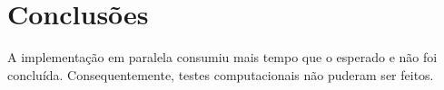 \section{Conclusões}
A implementação em paralela consumiu mais tempo que o esperado e não foi
concluída. Consequentemente, testes computacionais não puderam ser feitos.
